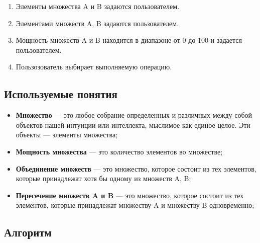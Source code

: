 \documentclass[a4paper,12pt]{extarticle}
\begin{document}
\begin{enumerate}
  \item Элементы множества A и B задаются пользователем.
  \item Элементами множеств A, B задаются пользователем.
  \item Мощность множеств A и B находится в диапазоне от 0 до 100 и задается пользователем.
  \item Пользозователь выбирает выполняемую операцию.
\end{enumerate}
\begin{center}
\section*{Используемые понятия}
\end{center}
\begin{itemize}
  \item\textbf{Множество} — это любое собрание определенных и различных между собой объектов нашей интуиции или интеллекта, мыслимое как единое целое. Эти объекты — элементы множества;
  \item\textbf{Мощность множества} — это количество элементов во множестве;
  \item\textbf{Объединение множеств} — это множество, которое состоит из тех элементов, которые принадлежат хотя бы одному из множеств A, B;
  \item\textbf{Пересечение множеств A и B} — это множество, которое состоит из тех элементов, которые  принадлежат множеству A и множеству B одновременно;
\end{itemize}
\begin{center}
\section*{Алгоритм}
\end{center}
\end{document}
